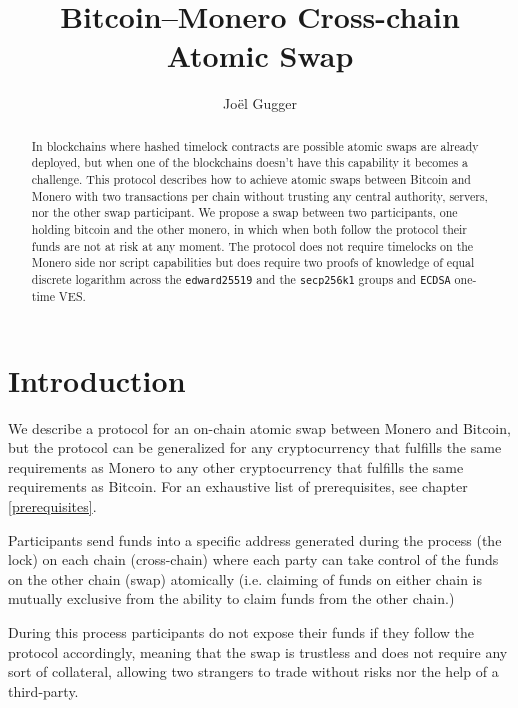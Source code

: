 \documentclass{llncs}
\begin{document}
\title{Bitcoin--Monero Cross-chain Atomic Swap}
\author{Jo\"el Gugger}


\maketitle

\begin{abstract}
    In blockchains where hashed timelock contracts are possible atomic swaps are already deployed, but when one of the blockchains doesn't have this capability it becomes a challenge. This protocol describes how to achieve atomic swaps between Bitcoin and Monero with two transactions per chain without trusting any central authority, servers, nor the other swap participant.
    We propose a swap between two participants, one holding bitcoin and the other monero, in which when both follow the protocol their funds are not at risk at any moment. The protocol does not require timelocks on the Monero side nor script capabilities but does require two proofs of knowledge of equal discrete logarithm across  the \texttt{edward25519} and the \texttt{secp256k1} groups and \texttt{ECDSA} one-time VES.
\end{abstract}

\section{Introduction}
We describe a protocol for an on-chain atomic swap between Monero and Bitcoin, but the protocol can be generalized for any cryptocurrency that fulfills the same requirements as Monero to any other cryptocurrency that fulfills the same requirements as Bitcoin. For an exhaustive list of prerequisites, see chapter \ref{prerequisites}.

Participants send funds into a specific address generated during the process (the lock) on each chain (cross-chain) where each party can take control of the funds on the other chain (swap) atomically (i.e. claiming of funds on either chain is mutually exclusive from the ability to claim funds from the other chain.)

During this process participants do not expose their funds if they follow the protocol accordingly, meaning that the swap is trustless and does not require any sort of collateral, allowing two strangers to trade without risks nor the help of a third-party.
\end{document}
